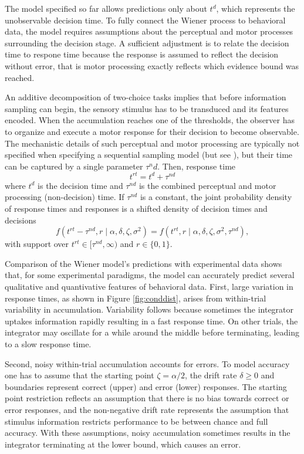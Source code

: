 \documentclass[12pt]{report}
\begin{document}
The model specified so far allows predictions only about $t^d$, which represents the unobservable 
decision time. To fully connect the Wiener process to behavioral
data, the model requires assumptions about the perceptual and motor
processes surrounding the decision stage. A  sufficient adjustment is to relate the decision time to respone time because the response is assumed to reflect the decision without error, that is motor processing exactly reflects which evidence bound was reached.

An additive decomposition of two-choice tasks implies that
before information sampling can begin, the sensory stimulus has to be
transduced and its features encoded. When the accumulation reaches one
of the thresholds, the observer has to organize and execute a motor
response for their decision to become observable. The mechanistic details of such
perceptual and motor processing are typically not specified when specifying a sequential sampling model (but see
\citet{SmiRat2009,BroMar2008}), but their time can be captured by a single parameter
$\tau^nd$. Then, response time
%
\begin{equation}
t^{rt} = t^d + \tau^{nd}
\end{equation}
%
where $t^d$ is the decision time and $\tau^{nd}$ is the combined perceptual
and motor processing (non-decision) time. If $\tau^{nd}$ is a
constant, the joint probability density of response times and responses is
a shifted density of decision times and decisions
%
\begin{equation}
f(t^{rt} - \tau^{nd}, r \mid \alpha, \delta, \zeta, \sigma^2) = f(t^{rt}, r \mid \alpha, \delta, \zeta, \sigma^2, \tau^{nd}),
\end{equation}
with support over $t^{rt} \in [\tau^{nd}, \infty)$ and $r \in \{0,1\}$.

Comparison of the Wiener model's predictions with experimental data shows that, for some experimental paradigms, the model can accurately predict several qualitative and quantivative features of behavioral data. First, large variation in response times, as shown in Figure \ref{fig:conddist}, arises from within-trial variability in accumulation. Variability follows because sometimes the integrator uptakes information rapidly resulting in a fast response time. On other trials, the integrator may oscillate for a while around the middle before terminating, leading to a slow response time. 

Second, noisy within-trial accumulation accounts for errors. To model accuracy one has to assume that the starting point $\zeta = \alpha /2$, the drift rate $\delta \geq 0$ and boundaries represent correct (upper) and error (lower) responses. The starting point restriction reflects an assumption that there is no bias towards correct or error responses, and the non-negative drift rate represents the assumption that stimulus information  restricts performance to be between chance and full accuracy. With these assumptions,  noisy accumulation sometimes results in the integrator terminating at the lower bound, which causes an error. 
\end{document}
